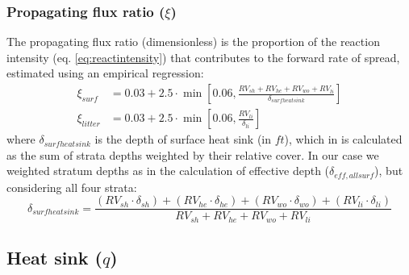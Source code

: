\documentclass[]{book}
\begin{document}
\hypertarget{propagating-flux-ratio-xi}{%
\subsubsection{\texorpdfstring{Propagating flux ratio (\(\xi\))}{Propagating flux ratio (\textbackslash{}xi)}}\label{propagating-flux-ratio-xi}}

The propagating flux ratio (dimensionless) is the proportion of the reaction intensity (eq. \eqref{eq:reactintensity}) that contributes to the forward rate of spread, estimated using an empirical regression:
\begin{eqnarray}
\xi_{surf} &= 0.03 + 2.5 \cdot \min \left[0.06, \frac{RV_{sh}+RV_{he}+RV_{wo}+RV_{li}}{\delta_{surfheatsink}} \right]\\
\xi_{litter} &= 0.03 + 2.5 \cdot \min \left[0.06, \frac{RV_{li}}{\delta_{li}} \right]
\end{eqnarray}
where \(\delta_{surfheatsink}\) is the depth of surface heat sink (in \(ft\)), which in \citet{Prichard2013} is calculated as the sum of strata depths weighted by their relative cover. In our case we weighted stratum depths as in the calculation of effective depth (\(\delta_{eff, allsurf}\)), but considering all four strata:
\begin{equation}
\delta_{surfheatsink} = \frac{(RV_{sh}\cdot \delta_{sh}) +(RV_{he}\cdot \delta_{he}) + (RV_{wo}\cdot \delta_{wo})+ (RV_{li}\cdot \delta_{li})}{RV_{sh} +RV_{he}+RV_{wo}+RV_{li}}
\end{equation}

\hypertarget{heat-sink-q}{%
\subsection{\texorpdfstring{Heat sink (\(q\))}{Heat sink (q)}}\label{heat-sink-q}}
\end{document}
